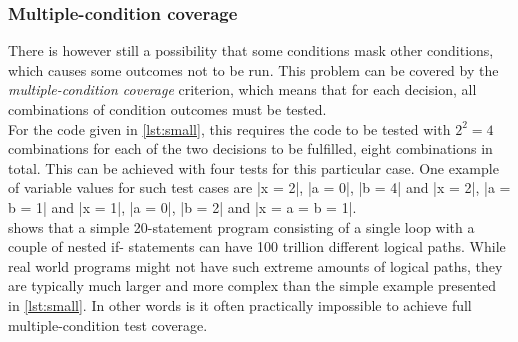 \subsubsection{Multiple-condition coverage}

There is however still a possibility that some conditions mask other
conditions, which causes some outcomes not to be run. This problem can
be covered by the \emph{multiple-condition coverage} criterion, which
means that for each decision, all combinations of condition outcomes
must be tested.\\

For the code given in \ref{lst:small}, this requires the code to be
tested with $2^2 = 4$ combinations for each of the two decisions to be
fulfilled, eight combinations in total. This can be achieved with four
tests for this particular case. One example of variable values for
such test cases are |x = 2|, |a = 0|, |b = 4| and |x = 2|, |a = b = 1|
and |x = 1|, |a = 0|, |b = 2| and |x = a = b = 1|.\\

\citeauthor{book:art_of_testing} shows that a simple 20-statement
program consisting of a single loop with a couple of nested if-
statements can have 100 trillion different logical paths. While real
world programs might not have such extreme amounts of logical paths,
they are typically much larger and more complex than the simple example
presented in \ref{lst:small}. In other words is it often practically
impossible to achieve full multiple-condition test coverage.\\
